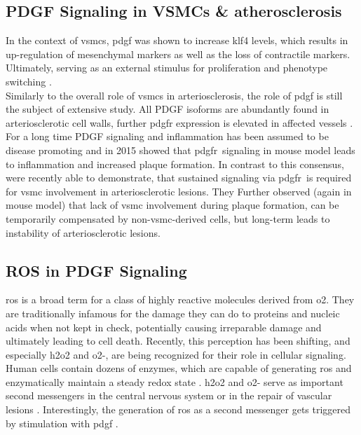     \subsection{PDGF Signaling in VSMCs \& atherosclerosis}
    \label{subsec:pdgf_in_disease}
    In the context of \acp{vsmc}, \ac{pdgf} was shown to increase \ac{klf4} levels, which results in up-regulation of mesenchymal markers as well as the loss of contractile markers. Ultimately, serving as an external stimulus for proliferation and phenotype switching \cite{yapSixShadesVascular2021}.\\
    Similarly to the overall role of \acp{vsmc} in arteriosclerosis, the role of \ac{pdgf} is still the subject of extensive study. All PDGF isoforms are abundantly found in arteriosclerotic cell walls, further \ac{pdgfr} expression is elevated in affected vessels \cite{huTargetingPlateletderivedGrowth2015}. For a long time PDGF signaling and inflammation has been assumed to be disease promoting \cite{andraeRolePlateletderivedGrowth2008, chenPlateletderivedGrowthFactors2013, huTargetingPlateletderivedGrowth2015} and in 2015 \textcite{hePDGFRvSignallingRegulates2015} showed that \ac{pdgfr}\beta~signaling in mouse model leads to inflammation and increased plaque formation. In contrast to this consensus, \textcite{newmanMultipleCellTypes2021} were recently able to demonstrate, that sustained signaling via \ac{pdgfr}\beta~is required for \ac{vsmc} involvement in arteriosclerotic lesions. They Further observed (again in mouse model) that lack of \ac{vsmc} involvement during plaque formation, can be temporarily compensated by non-\ac{vsmc}-derived cells, but long-term leads to instability of arteriosclerotic lesions.

    \subsection{ROS in PDGF Signaling}
    \label{subsec:ROS_signaling}
    \Ac{ros} is a broad term for a class of highly reactive molecules derived from \ac{o2}. They are traditionally infamous for the damage they can do to proteins and nucleic acids when not kept in check, potentially causing irreparable damage and ultimately leading to cell death. Recently, this perception has been shifting, and especially \ac{h2o2} and \ac{o2-}, are being recognized for their role in cellular signaling. \cite{siesReactiveOxygenSpecies2020}\\
    Human cells contain dozens of enzymes, which are capable of generating \ac{ros} and enzymatically maintain a steady redox state \cite{siesReactiveOxygenSpecies2020}. \ac{h2o2} and \ac{o2-} serve as important second messengers in the central nervous system \cite{nayerniaNewInsightsNOX2014} or in the repair of vascular lesions \cite{andraeRolePlateletderivedGrowth2008}. Interestingly, the generation of \ac{ros} as a second messenger gets triggered by stimulation with \ac{pdgf} \cite{sundaresanRequirementGenerationH2O21995, bouziguesRegulationROSResponse2014a}.


